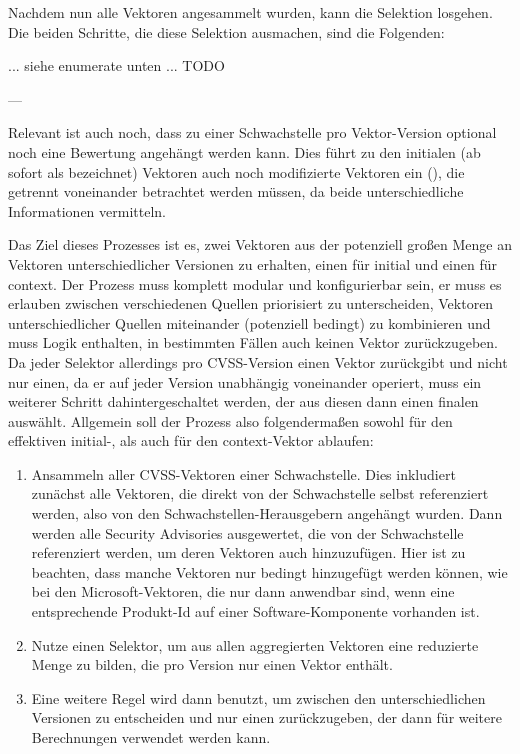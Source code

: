 Nachdem nun alle Vektoren angesammelt wurden, kann die Selektion losgehen.
Die beiden Schritte, die diese Selektion ausmachen, sind die Folgenden:

... siehe enumerate unten ... TODO

---

Relevant ist auch noch, dass zu einer Schwachstelle pro Vektor-Version optional noch eine Bewertung angehängt werden kann.
Dies führt zu den initialen (ab sofort als  bezeichnet) Vektoren auch noch modifizierte Vektoren ein (), die getrennt voneinander betrachtet werden müssen, da beide unterschiedliche Informationen vermitteln.

Das Ziel dieses Prozesses ist es, zwei Vektoren aus der potenziell großen Menge an Vektoren unterschiedlicher Versionen zu erhalten, einen für initial und einen für context.
Der Prozess muss komplett modular und konfigurierbar sein, er muss es erlauben zwischen verschiedenen Quellen priorisiert zu unterscheiden, Vektoren unterschiedlicher Quellen miteinander (potenziell bedingt) zu kombinieren und muss Logik enthalten, in bestimmten Fällen auch keinen Vektor zurückzugeben.
Da jeder Selektor allerdings pro CVSS-Version einen Vektor zurückgibt und nicht nur einen, da er auf jeder Version unabhängig voneinander operiert, muss ein weiterer Schritt dahintergeschaltet werden, der aus diesen dann einen finalen auswählt.
Allgemein soll der Prozess also folgendermaßen sowohl für den effektiven initial-, als auch für den context-Vektor ablaufen:

\begin{enumerate}
    \item Ansammeln aller CVSS-Vektoren einer Schwachstelle.
    Dies inkludiert zunächst alle Vektoren, die direkt von der Schwachstelle selbst referenziert werden, also von den Schwachstellen-Herausgebern angehängt wurden.
    Dann werden alle Security Advisories ausgewertet, die von der Schwachstelle referenziert werden, um deren Vektoren auch hinzuzufügen.
    Hier ist zu beachten, dass manche Vektoren nur bedingt hinzugefügt werden können, wie bei den Microsoft-Vektoren, die nur dann anwendbar sind, wenn eine entsprechende Produkt-Id auf einer Software-Komponente vorhanden ist.
    \item Nutze einen Selektor, um aus allen aggregierten Vektoren eine reduzierte Menge zu bilden, die pro Version nur einen Vektor enthält.
    \item Eine weitere Regel wird dann benutzt, um zwischen den unterschiedlichen Versionen zu entscheiden und nur einen zurückzugeben, der dann für weitere Berechnungen verwendet werden kann.
\end{enumerate}

